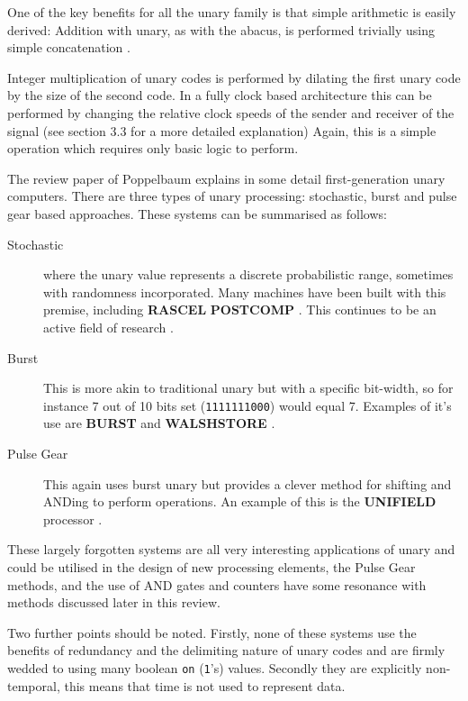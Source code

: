 \documentclass{article}
\begin{document}
One of the key benefits for all the unary family is that simple arithmetic is easily derived: Addition with unary, as with the abacus, is performed trivially using simple concatenation \cite{jonny1}.

Integer multiplication of unary codes is performed by dilating the first unary code by the size of the second code. In a fully clock based architecture this can be performed by changing the relative clock speeds of the sender and receiver of the signal (see \cite{jonny1} section 3.3 for a more detailed explanation)  Again, this is a simple operation which requires only basic logic to perform.

The review paper of Poppelbaum \cite{POPPELBAUM198747} explains in some detail first-generation unary computers. There are three types of unary processing: stochastic, burst and pulse gear based approaches. These systems can be summarised as follows:

\begin{description}
	\item[Stochastic] where the unary value represents a discrete probabilistic range, sometimes with randomness incorporated. Many machines have been built with this premise, including \textbf{RASCEL} \cite{esch1969rascel} \textbf{POSTCOMP} \cite{poppelbaum1967stochastic}. This continues to be an active field of research \cite{alaghi2013survey}.
	\item[Burst] This is more akin to traditional unary but with a specific bit-width, so for instance 7 out of 10 bits set (\texttt{1111111000}) would equal 7. Examples of it's use are \textbf{BURST} \cite{POPPELBAUM198747} and \textbf{WALSHSTORE} \cite{bracha1978walshstore}.
	\item[Pulse Gear] This again uses burst unary but provides a clever method for shifting and ANDing to perform operations. An example of this is the \textbf{UNIFIELD} processor \cite{dollas1987architecture}.
\end{description}

These largely forgotten systems are all very interesting applications of unary and could be utilised in the design of new processing elements, the Pulse Gear methods, and the use of AND gates and counters have some resonance with methods discussed later in this review.

Two further points should be noted. Firstly, none of these systems use the benefits of redundancy and the delimiting nature of unary codes and are firmly wedded to using many boolean \texttt{on} (\texttt{1}'s) values. Secondly they are explicitly non-temporal, this means that time is not used to represent data.
\end{document}
